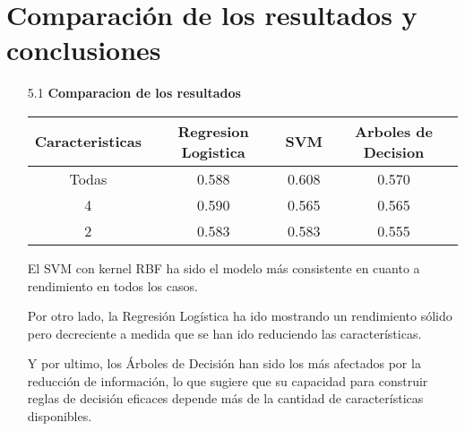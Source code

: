 \documentclass{article}
\begin{document}
\newpage

\section[5]{Comparaci\'on de los resultados y conclusiones}

\begin{itemize}

\item[5.1]  {\bf Comparacion de los resultados}

\begin{table}[h]
  \begin{center}
    \begin{tabular}{| c | c | c | c | }
      \hline
      Caracteristicas & Regresion Logistica & SVM & Arboles de Decision \\ \hline
      Todas & 0.588 & 0.608 & 0.570 \\
      4     & 0.590 & 0.565 & 0.565 \\
      2     & 0.583 & 0.583 & 0.555 \\ \hline
    \end{tabular}
  \end{center}
\end{table}

El SVM con kernel RBF ha sido el modelo más consistente en cuanto a rendimiento en todos los casos. 

Por otro lado, la Regresión Logística ha ido mostrando un rendimiento sólido pero decreciente a medida que se han ido reduciendo las características. 

Y por ultimo, los Árboles de Decisión han sido los más afectados por la reducción de información, lo que sugiere que su capacidad para construir reglas de decisión eficaces depende más de la cantidad de características disponibles.

\end{itemize}

\bigskip
\end{document}
